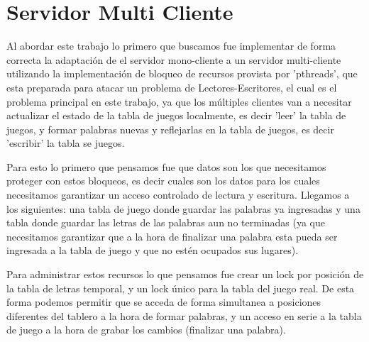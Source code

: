\documentclass{article}
\begin{document}
{} %

\subtitulo{}
\grupo{}

 
\maketitle

\pagebreak

\tableofcontents

\pagebreak

\section{Servidor Multi Cliente}

Al abordar este trabajo lo primero que buscamos fue implementar de forma correcta la adaptación de el servidor mono-cliente a un servidor multi-cliente utilizando la implementación de bloqueo de recursos provista por 'pthreads', que esta preparada para atacar un problema de Lectores-Escritores, el cual es el problema principal en este trabajo, ya que los múltiples clientes van a necesitar actualizar el estado de la tabla de juegos localmente, es decir 'leer' la tabla de juegos, y formar palabras nuevas y reflejarlas en la tabla de juegos, es decir 'escribir' la tabla se juegos.\par\smallbreak

Para esto lo primero que pensamos fue que datos son los que necesitamos proteger con estos bloqueos, es decir cuales son los datos para los cuales necesitamos garantizar un acceso controlado de lectura y escritura. Llegamos a los siguientes: una tabla de juego donde guardar las palabras ya ingresadas y una tabla donde guardar las letras de las palabras aun no terminadas (ya que necesitamos garantizar que a la hora de finalizar una palabra esta pueda ser ingresada a la tabla de juego y que no estén ocupados sus lugares).\par\smallbreak

Para administrar estos recursos lo que pensamos fue crear un lock por posición de la tabla de letras temporal, y un lock único para la tabla del juego real. De esta forma podemos permitir que se acceda de forma simultanea a posiciones diferentes del tablero a la hora de formar palabras, y un acceso en serie a la tabla de juego a la hora de grabar los cambios (finalizar una palabra).\par\smallbreak
\end{document}
